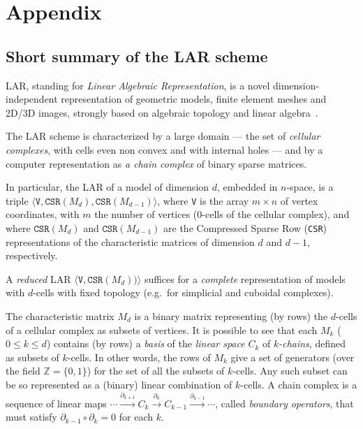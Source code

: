 \appendix
\section{Appendix}
\subsection{Short summary of the LAR scheme}\label{sec:lar}

LAR, standing for \emph{Linear Algebraic Representation}, is a novel dimension-independent representation of geometric models, finite element meshes and 2D/3D images, strongly based on algebraic topology and linear algebra~\cite{Dicarlo:2014:TNL:2543138.2543294,cadanda:2015}.

The LAR scheme is characterized by a large domain --- the set of \emph{cellular complexes}, with cells even non convex and with internal holes --- and by a computer representation as \emph{a chain complex} of binary sparse matrices. 

In particular, the LAR of a model of dimension $d$, embedded in $n$-space, is a triple $\langle \texttt{V}, \texttt{CSR}(M_d), \texttt{CSR}(M_{d-1}) \rangle$, where 
\texttt{V} is the array $m\times n$ of vertex coordinates, with $m$ the number of vertices (0-cells of the cellular complex), and where 
$\texttt{CSR}(M_d)$ and $\texttt{CSR}(M_{d-1})$ are the Compressed Sparse Row (\texttt{CSR}) representations of the characteristic matrices of dimension $d$ and $d-1$, respectively.  

A \emph{reduced} LAR $\langle \texttt{V}, \texttt{CSR}(M_d)) \rangle$ suffices for a \emph{complete} representation of models with $d$-cells with fixed topology (e.g.~for simplicial and cuboidal complexes).

The characteristic matrix $M_d$ is a binary matrix representing (by rows) the $d$-cells of a cellular complex as subsets of vertices. It is possible to see that each $M_k$ ($0\leq k\leq d$) contains (by rows) a \emph{basis} of the \emph{linear space} $C_k$ of \emph{$k$-chains}, defined as subsets of $k$-cells. In other words, the rows of $M_k$ give a set of generators (over the field $\mathbb{Z} = \{0,1\}$) for the set of all the subsets of $k$-cells. Any such subset can be so represented as a (binary) linear combination of $k$-cells.
A chain complex is a sequence of linear maps $ \cdots \xrightarrow{\partial_{k+1}} C_k \xrightarrow{\partial_k} C_{k-1} \xrightarrow{\partial_{k-1}} \cdots $, called \emph{boundary operators}, that must satisfy $\partial_{k-1} \circ \partial_k=0$ for each $k$.

